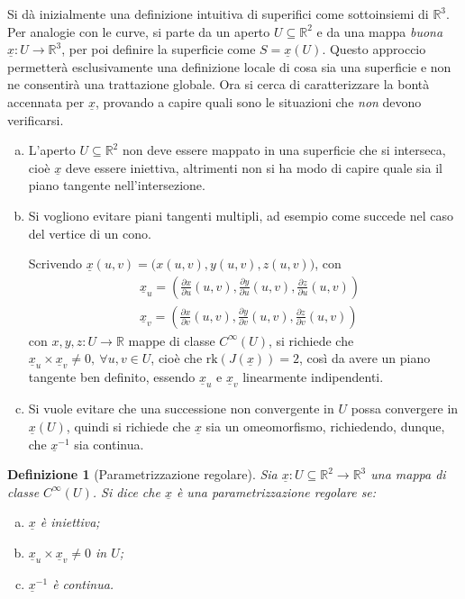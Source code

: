 \documentclass[12pt]{scrartcl}
\theoremstyle{style}
\newtheorem{definizione}{Definizione}[section]
\numberwithin{equation}{subsection}
\begin{document}
Si d\`a inizialmente una definizione intuitiva di superifici come sottoinsiemi di $\mathbb{R}^3$.
Per analogie con le curve, si parte da un aperto $U \subseteq \mathbb{R}^2$ e da una mappa \textit{buona} $\underline{x}:U\to \mathbb{R}^3$, per poi definire la superficie come $S = \underline{x}(U)$.
Questo approccio permetter\`a esclusivamente una definizione locale di cosa sia una superficie e non ne consentir\`a una trattazione globale.
Ora si cerca di caratterizzare la bont\`a accennata per $\underline{x}$, provando a capire quali sono le situazioni che \textit{non} devono verificarsi.
\begin{enumerate}[(a).]
	\item L'aperto $U\subseteq \mathbb{R}^2$ non deve essere mappato in una superficie che si interseca, cio\`e $\underline{x}$ deve essere iniettiva, altrimenti non si ha modo di capire quale sia il piano tangente nell'intersezione.
	\item Si vogliono evitare piani tangenti multipli, ad esempio come succede nel caso del vertice di un cono.
		
		Scrivendo $\underline{x}(u,v) = \big(x(u,v),y(u,v),z(u,v)\big)$, con
		\[
		\begin{split}
			&\underline{x}_u = \left(\frac{\partial x}{\partial u} (u,v), \frac{\partial y}{\partial u} (u,v), \frac{\partial z}{\partial u} (u,v)\right) \\
			&\underline{x}_v = \left(\frac{\partial x}{\partial v} (u,v), \frac{\partial y}{\partial v} (u,v), \frac{\partial z}{\partial v} (u,v)\right)
		\end{split}
		\] 
		con $x,y,z : U \to \mathbb{R}$ mappe di classe $C^\infty(U)$, si richiede che $\underline{x}_u \times \underline{x}_v \neq 0, \ \forall u,v \in U$, cio\`e che $\mathrm{rk} (J(\underline{x})) = 2$, cos\`i da avere un piano tangente ben definito, essendo $\underline{x}_u$ e $\underline{x}_v$ linearmente indipendenti.
	\item Si vuole evitare che una successione non convergente in $U$ possa convergere in $\underline{x}(U)$, quindi si richiede che $\underline{x}$ sia un omeomorfismo, richiedendo, dunque, che $\underline{x}^{-1}$ sia continua.
\end{enumerate}
\begin{definizione}
	[Parametrizzazione regolare]
	Sia $\underline{x}:U\subseteq \mathbb{R}^2 \to \mathbb{R}^3$ una mappa di classe $C^\infty(U)$.
	Si dice che $\underline{x}$ \`e una \textit{parametrizzazione regolare} se:
	\begin{enumerate}[(a).]
		\item $\underline{x}$ \`e iniettiva;
		\item $\underline{x}_u \times \underline{x}_v \neq 0$ in $U$;
		\item $\underline{x}^{-1}$ \`e continua.
	\end{enumerate}
\end{definizione}
\end{document}
